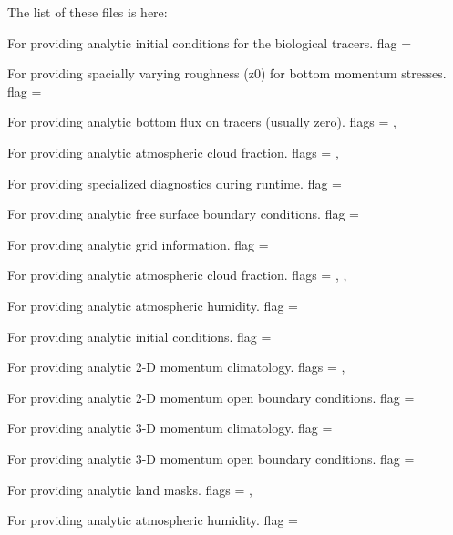 The list of these files is here:
\begin{klist}
For providing analytic initial conditions for the biological tracers.
 flag = 

For providing spacially varying roughness (z0) for bottom momentum
stresses.
 flag =  

For providing analytic bottom flux on tracers (usually zero).
 flags = , 

For providing analytic atmospheric cloud fraction.
 flags = , 

For providing specialized diagnostics during runtime.
 flag = 

For providing analytic free surface boundary conditions.
 flag = 

For providing analytic grid information.
 flag = 

For providing analytic atmospheric cloud fraction.
 flags = , , 

For providing analytic atmospheric humidity.
 flag = 

For providing analytic initial conditions.
 flag = 

For providing analytic 2-D momentum climatology.
 flags = , 

For providing analytic 2-D momentum open boundary conditions.
 flag = 

For providing analytic 3-D momentum climatology.
 flag = 

For providing analytic 3-D momentum open boundary conditions.
 flag = 

For providing analytic land masks.
 flags = ,

For providing analytic atmospheric humidity.
 flag = 


\end{klist}
